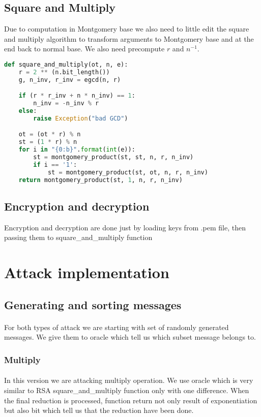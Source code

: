 \documentclass[thesis=B,english]{FITthesis}[2012/10/20]
\begin{document}
{\subsection{Square and Multiply}{
Due to computation in Montgomery base we also need to little edit the square and multiply algorithm to transform arguments to Montgomery base and at the end back to normal base.
We also need precompute \(r\) and \(n^{-1}\).
}

\begin{lstlisting}[language=Python]
 def square_and_multiply(ot, n, e):
    r = 2 ** (n.bit_length())
    g, n_inv, r_inv = egcd(n, r)

    if (r * r_inv + n * n_inv) == 1:
        n_inv = -n_inv % r
    else:
        raise Exception("bad GCD")

    ot = (ot * r) % n
    st = (1 * r) % n
    for i in "{0:b}".format(int(e)):
        st = montgomery_product(st, st, n, r, n_inv)
        if i == '1':
            st = montgomery_product(st, ot, n, r, n_inv)
    return montgomery_product(st, 1, n, r, n_inv)
\end{lstlisting}

\subsection{Encryption and decryption}{
Encryption and decryption are done just by loading keys from .pem file, then passing them to square\_and\_multiply function
}

\section{Attack implementation}

\subsection{Generating and sorting messages}
\paragraph*{}{ 
For both types of attack we are starting with set of randomly generated messages. We give them to oracle which tell us which subset message belongs to.

}

\subsubsection{Multiply}
\paragraph*{}{
In this version we are attacking multiply operation. We use oracle which is very similar to RSA square\_and\_multiply function only with one difference.
When the final reduction is processed, function return not only result of exponentiation but also bit which tell us that the reduction have been done.}

}
\end{document}
